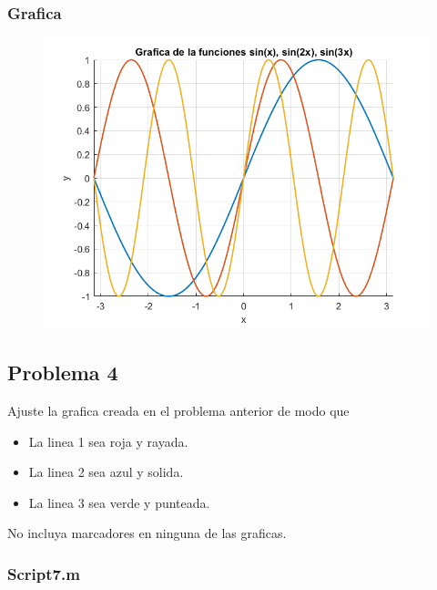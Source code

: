 \documentclass{article}
\begin{document}
	\subsubsection{Grafica}
	
	\begin{figure}[h]
		\centering
		\includegraphics[width=\textwidth]{grafica6.png}
	\end{figure}
	
	\newpage
	
	\subsection{Problema 4}
	
	Ajuste la grafica creada en el problema anterior de modo que
	\begin{itemize}
		\item La linea 1 sea roja y rayada.
		\item La linea 2 sea azul y solida.
		\item La linea 3 sea verde y punteada.
	\end{itemize}
	No incluya marcadores en ninguna de las graficas.
	\subsubsection{Script7.m}
	
\end{document}
